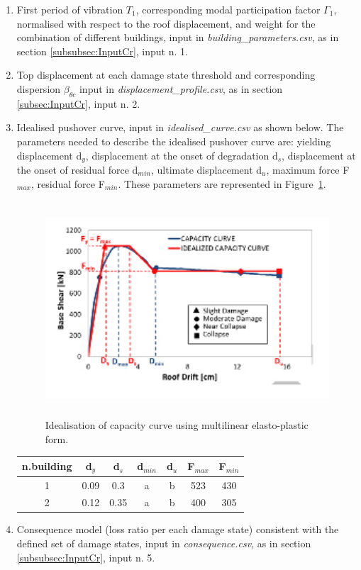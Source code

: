 \begin{enumerate}
\item First period of vibration $T_1$, corresponding modal participation factor $\Gamma_1$, normalised with respect to the roof displacement, and weight for the combination of different buildings, input in \textit{building\_parameters.csv}, as in section \ref{subsubsec:InputCr}, input n. 1.
	
\item Top displacement at each damage state threshold and corresponding dispersion $\beta_{\theta c}$ input in \textit{displacement\_profile.csv}, as in section \ref{subsec:InputCr}, input n. 2. 
	
\item Idealised pushover curve, input in \textit{idealised\_curve.csv} as shown below. The parameters needed to describe the idealised pushover curve are: yielding displacement d$_y$, displacement at the onset of degradation d$_s$, displacement at the onset of residual force d$_{min}$, ultimate displacement d$_u$, maximum force F$_{max}$, residual force F$_{min}$. These parameters are represented in Figure~\ref{fig:quadrilinear}.

\begin{figure}[H]
\centering
\includegraphics[width=12cm,height=8cm]{./figures/quadrilinear.jpg}
\caption{Idealisation of capacity curve using multilinear elasto-plastic form.}
\label{fig:quadrilinear}
\end{figure}

\begin{table}[H]
\centering
\begin{tabular}{|c|c|c|c|c|c|c|} \hline
\textbf{n.building} & \textbf{d$_y$} & \textbf{d$_s$} & \textbf{d$_{min}$} & \textbf{d$_u$} & \textbf{F$_{max}$} & \textbf{F$_{min}$} \\ \hline
1 & 0.09	& 0.3	& a & b & 523 & 430\\ \hline
2 & 0.12	& 0.35	 & a & b & 400 & 305\\ \hline	
\end{tabular}
\end{table}

\item Consequence model (loss ratio per each damage state) consistent with the defined set of damage states, input in \textit{consequence.csv}, as in section \ref{subsubsec:InputCr}, input n. 5.
	
\end{enumerate}

